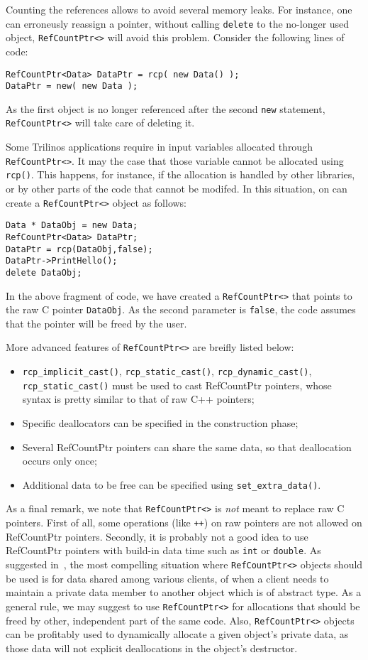Counting the references allows to avoid several memory leaks. For
instance, one can erroneusly reassign a pointer, without calling
\verb!delete! to the no-longer used object, \verb!RefCountPtr<>! will
avoid this problem. Consider the following lines of code:
\begin{verbatim}
RefCountPtr<Data> DataPtr = rcp( new Data() );    
DataPtr = new( new Data );
\end{verbatim}
As the first object is no longer referenced after the second \verb!new!
statement, \verb!RefCountPtr<>! will take care of deleting it.

Some Trilinos applications require in input variables allocated through
\verb!RefCountPtr<>!. It may the case that those variable cannot be
allocated using \verb!rcp()!. This happens, for instance, if the
allocation is handled by other libraries, or by other parts of the code
that cannot be modifed. In this situation, on can create a
\verb!RefCountPtr<>! object as follows:
\begin{verbatim}
Data * DataObj = new Data;
RefCountPtr<Data> DataPtr;
DataPtr = rcp(DataObj,false);
DataPtr->PrintHello();
delete DataObj;
\end{verbatim}
In the above fragment of code, we have created a \verb!RefCountPtr<>!
that points to the raw C pointer \verb!DataObj!. As the second parameter
is \verb!false!, the code assumes that the pointer will be freed by the
user. 

More advanced features of \verb!RefCountPtr<>! are breifly listed below:
\begin{itemize}
\item \verb!rcp_implicit_cast()!, \verb!rcp_static_cast()!,
  \verb!rcp_dynamic_cast()!, \verb!rcp_static_cast()! must be used to
  cast RefCountPtr pointers, whose syntax is pretty similar to that of
  raw C++ pointers;
\item Specific deallocators can be specified in the construction phase;
\item Several RefCountPtr pointers can share the same data, so that
  deallocation occurs only once;
\item Additional data to be free can be specified using
  \verb!set_extra_data()!.
\end{itemize}

As a final remark, we note that \verb!RefCountPtr<>! is {\sl not} meant
to replace raw C pointers. First of all, some operations (like
\verb!++!) on raw pointers are not allowed on RefCountPtr pointers.
Secondly, it is probably not a good idea to use RefCountPtr pointers
with build-in data time such as \verb!int! or \verb!double!. As
suggested in~\cite{RefCountPtr-manual}, the most compelling situation
where \verb!RefCountPtr<>! objects should be used is for data shared
among various clients, of when a client needs to maintain a private data
member to another object which is of abstract type. As a general rule,
we may suggest to use \verb!RefCountPtr<>! for allocations that should
be freed by other, independent part of the same code. Also,
\verb!RefCountPtr<>! objects can be profitably used to dynamically
allocate a given object's private data, as those data will not explicit
deallocations in the object's destructor.

